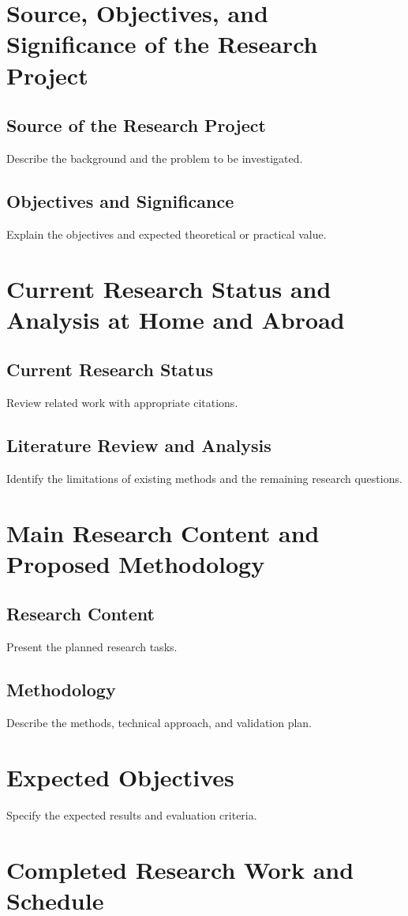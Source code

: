 \section{Source, Objectives, and Significance of the Research Project}
\subsection{Source of the Research Project}
Describe the background and the problem to be investigated.
\subsection{Objectives and Significance}
Explain the objectives and expected theoretical or practical value.
\section{Current Research Status and Analysis at Home and Abroad}
\subsection{Current Research Status}
Review related work with appropriate citations.
\subsection{Literature Review and Analysis}
Identify the limitations of existing methods and the remaining research questions.
\section{Main Research Content and Proposed Methodology}
\subsection{Research Content}
Present the planned research tasks.
\subsection{Methodology}
Describe the methods, technical approach, and validation plan.
\section{Expected Objectives}
Specify the expected results and evaluation criteria.
\section{Completed Research Work and Schedule}

